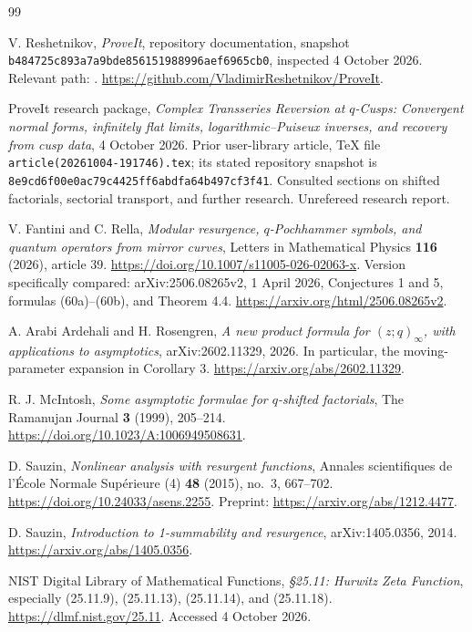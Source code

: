 \documentclass[11pt,a4paper]{article}
\numberwithin{equation}{section}
\theoremstyle{definition}
\theoremstyle{remark}\newtheorem{remark}[theorem]{Remark}
\begin{document}
\begin{thebibliography}{99}
\raggedright

V. Reshetnikov, \emph{ProveIt}, repository documentation, snapshot
\texttt{b484725c893a7a9bde856151988996aef6965cb0}, inspected 4 October 2026.
Relevant path:
.
\url{https://github.com/VladimirReshetnikov/ProveIt}.

ProveIt research package, \emph{Complex Transseries Reversion at
$q$-Cusps: Convergent normal forms, infinitely flat limits,
logarithmic--Puiseux inverses, and recovery from cusp data}, 4 October
2026. Prior user-library article, TeX file
\texttt{article(20261004-191746).tex}; its stated repository snapshot is
\texttt{8e9cd6f00e0ac79c4425ff6abdfa64b497cf3f41}.
Consulted sections on shifted factorials, sectorial transport, and
further research. Unrefereed research report.

V. Fantini and C. Rella, \emph{Modular resurgence, $q$-Pochhammer
symbols, and quantum operators from mirror curves}, Letters in
Mathematical Physics \textbf{116} (2026), article 39.
\url{https://doi.org/10.1007/s11005-026-02063-x}.
Version specifically compared: arXiv:2506.08265v2, 1 April 2026,
Conjectures 1 and 5, formulas (60a)--(60b), and Theorem 4.4.
\url{https://arxiv.org/html/2506.08265v2}.

A. Arabi Ardehali and H. Rosengren, \emph{A new product formula for
$(z;q)_\infty$, with applications to asymptotics}, arXiv:2602.11329,
2026. In particular, the moving-parameter expansion in Corollary 3.
\url{https://arxiv.org/abs/2602.11329}.

R. J. McIntosh, \emph{Some asymptotic formulae for $q$-shifted factorials},
The Ramanujan Journal \textbf{3} (1999), 205--214.
\url{https://doi.org/10.1023/A:1006949508631}.

D. Sauzin, \emph{Nonlinear analysis with resurgent functions},
Annales scientifiques de l'\'Ecole Normale Sup\'erieure (4)
\textbf{48} (2015), no.~3, 667--702.
\url{https://doi.org/10.24033/asens.2255}.
Preprint: \url{https://arxiv.org/abs/1212.4477}.

D. Sauzin, \emph{Introduction to 1-summability and resurgence},
arXiv:1405.0356, 2014.
\url{https://arxiv.org/abs/1405.0356}.

NIST Digital Library of Mathematical Functions,
\emph{\S25.11: Hurwitz Zeta Function}, especially (25.11.9),
(25.11.13), (25.11.14), and (25.11.18).
\url{https://dlmf.nist.gov/25.11}. Accessed 4 October 2026.


\end{thebibliography}
\end{document}
